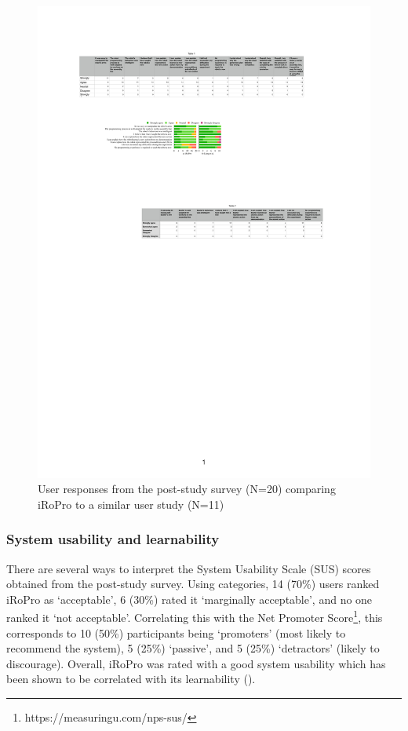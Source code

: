 
\begin{figure}
  \includegraphics[width=0.98\linewidth]{figures/quan-exp1vsexp2-results.pdf}
  \caption{User responses from the post-study survey (N=20) comparing iRoPro to a similar user study (N=11) \cite{liang2017evaluation}}
\label{fig:exp1vsexp2-results}
\end{figure}

\subsubsection{System usability and learnability} 
There are several ways to interpret the System Usability Scale (SUS) scores \cite{brooke2013sus} obtained from the post-study survey. 
Using \citet{bangor2008suseval} categories, 14 (70\%) users ranked iRoPro as `acceptable', 6 (30\%) rated it `marginally acceptable', and no one ranked it `not acceptable'.
Correlating this with the Net Promoter Score\footnote{https://measuringu.com/nps-sus/}, this corresponds to 10 (50\%) participants being `promoters' (most likely to recommend the system), 5 (25\%) `passive', and 5 (25\%) `detractors' (likely to discourage).
Overall, iRoPro was rated with a good system usability which has been shown to be correlated with its learnability (\cite{borsci2009dimensionality,sauro2011practical}).

